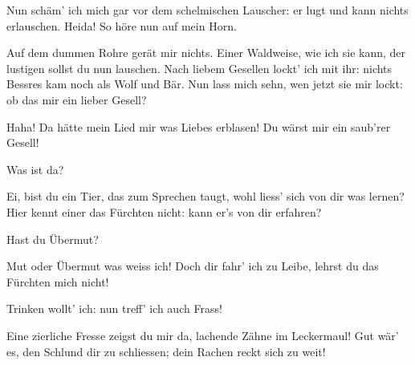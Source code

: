 \begin{drama}
Nun schäm' ich mich gar
vor dem schelmischen Lauscher:
er lugt und kann nichts erlauschen.
Heida! So höre
nun auf mein Horn.


Auf dem dummen Rohre
gerät mir nichts.
Einer Waldweise,
wie ich sie kann,
der lustigen sollst du nun lauschen.
Nach liebem Gesellen
lockt' ich mit ihr:
nichts Bessres kam noch
als Wolf und Bär.
Nun lass mich sehn,
wen jetzt sie mir lockt:
ob das mir ein lieber Gesell?



Haha! Da hätte mein Lied
mir was Liebes erblasen!
Du wärst mir ein saub'rer Gesell!

\Fafnerspeaks


Was ist da?

\Siegfriedspeaks

Ei, bist du ein Tier,
das zum Sprechen taugt,
wohl liess' sich von dir was lernen?
Hier kennt einer
das Fürchten nicht:
kann er's von dir erfahren?

\Fafnerspeaks

Hast du Übermut?

\Siegfriedspeaks

Mut oder Übermut
was weiss ich!
Doch dir fahr' ich zu Leibe,
lehrst du das Fürchten mich nicht!

\Fafnerspeaks


Trinken wollt' ich:
nun treff' ich auch Frass!


\Siegfriedspeaks

Eine zierliche Fresse
zeigst du mir da,
lachende Zähne
im Leckermaul!
Gut wär' es, den Schlund dir zu schliessen;
dein Rachen reckt sich zu weit!


\end{drama}
